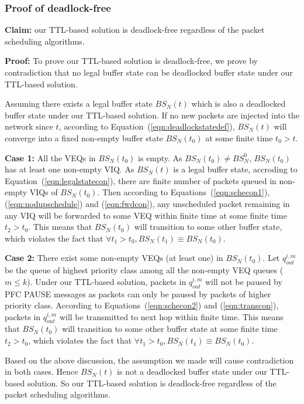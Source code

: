     \subsubsection{Proof of deadlock-free}
    

    
    \textbf{Claim:} our TTL-based solution is deadlock-free regardless of the packet scheduling algorithms.
  
    \textbf{Proof:} To prove our TTL-based solution is deadlock-free, we prove by contradiction that no legal buffer state can be deadlocked buffer state under our TTL-based solution.
    
    Assuming there exists a legal buffer state  $BS_N(t)$ which is also a deadlocked buffer state under our TTL-based solution. If no new packets are injected into the network since $t$, according to Equation~(\ref{eqn:deadlockstatedef}), $BS_N(t)$ will converge into a fixed non-empty buffer state $BS_N(t_0)$ at some finite time $t_0>t$. 
    
    
   \textbf{Case 1:} All the VEQs in $BS_N(t_0)$ is empty. As $BS_N(t_0) \neq BS^0_N$, $BS_N(t_0)$ has at least one non-empty VIQ. As $BS_N(t)$ is a legal buffer state, accroding to Equation~(\ref{eqn:legalstatecon}), there are finite number of packets queued in non-empty VIQs of $BS_N(t_0)$. Then according to Equations~(\ref{eqn:schecon1}), (\ref{eqn:nodupschedule}) and (\ref{eqn:fwdcon}), any unscheduled packet remaining in any VIQ will be forwarded to some VEQ within finite time at some finite time $t_2>t_0$. This means that $BS_N(t_0)$ will transition to some other buffer state, which violates the fact that $\forall t_1>t_0, BS_N(t_1)\equiv BS_N(t_0)$.
   
   \textbf{Case 2:} There exist some non-empty VEQs (at least one) in $BS_N(t_0)$. Let $q_{out}^{i,m}$ be the queue of highest priority class among all the non-empty VEQ queues ($m\leq k$). Under our TTL-based solution, packets in $q_{out}^{i,m}$ will not be paused by PFC PAUSE messages as packets can only be paused by packets of higher priority class. According to Equations~(\ref{eqn:schecon2}) and (\ref{eqn:transcon}), packets in $q_{out}^{i,m}$ will be transmitted to next hop within finite time. This means that $BS_N(t_0)$ will transition to some other buffer state  at some finite time $t_2>t_0$, which violates the fact that $\forall t_1>t_0, BS_N(t_1)\equiv BS_N(t_0)$.
   
   Based on the above discussion, the assumption we made will cause contradiction in both cases. Hence $BS_N(t)$ is not a deadlocked buffer state under our TTL-based solution. So our TTL-based solution is deadlock-free regardless of the packet scheduling algorithms.
    
